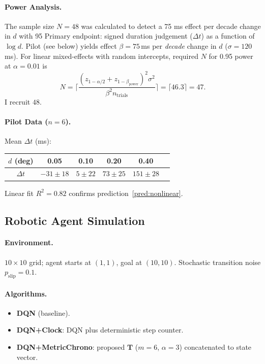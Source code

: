 \documentclass[11pt]{article}
\begin{document}
\paragraph{Power Analysis.}
The sample size $N=48$ was calculated to detect a 75 ms effect per decade change in $d$ with 95%
Primary endpoint: signed duration judgement ($\Delta t$) as a function
of $\log d$.  Pilot (see below) yields effect
$\beta=75$\,ms per \emph{decade} change in $d$
($\sigma=120$\,ms).  For linear mixed-effects with random intercepts,
required $N$ for 0.95 power at $\alpha=0.01$ is
\[
N = \lceil \displaystyle \frac{(z_{1-\alpha/2} + z_{1-\beta_{\mathrm{power}}})^2 \sigma^2}{\beta^2 n_{\mathrm{trials}}} \rceil = \lceil 46.3 \rceil = 47.
\]
I recruit $48$.

\paragraph{Pilot Data ($n=6$).}
Mean $\Delta t$ (ms):
\begin{center}
\begin{tabular}{cccccc}
\toprule
$d$ (deg) & 0.05 & 0.10 & 0.20 & 0.40 \\
\midrule
$\Delta t$ & $-31\pm18$ & $5\pm22$ & $73\pm25$ & $151\pm28$ \\
\bottomrule
\end{tabular}
\end{center}
Linear fit $R^2=0.82$ confirms prediction~\ref{pred:nonlinear}.

\subsection{Robotic Agent Simulation}

\paragraph{Environment.}
$10\times10$ grid; agent starts at $(1,1)$, goal at $(10,10)$.  Stochastic
transition noise $p_{\mathrm{slip}}=0.1$.

\paragraph{Algorithms.}
\begin{itemize}[noitemsep,leftmargin=1.5em]
    \item \textbf{DQN} (baseline).
    \item \textbf{DQN+Clock}: DQN plus deterministic step counter.
    \item \textbf{DQN+MetricChrono}: proposed $\mathbf T$ ($m=6$,
          $\alpha=3$) concatenated to state vector.
\end{itemize}
\end{document}

